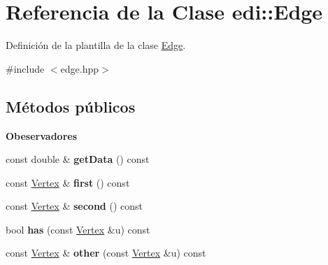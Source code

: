 \hypertarget{classedi_1_1Edge}{}\section{Referencia de la Clase edi\+:\+:Edge}
\label{classedi_1_1Edge}


Definición de la plantilla de la clase \hyperlink{classedi_1_1Edge}{Edge}.  




{\ttfamily \#include $<$edge.\+hpp$>$}

\subsection*{Métodos públicos}
\begin{Indent}{\bf Obeservadores}\par
\begin{DoxyCompactItemize}
\item 
\hypertarget{classedi_1_1Edge_a8eb51032db5e32ea749cb35c200421b3}{}const double \& {\bfseries get\+Data} () const \label{classedi_1_1Edge_a8eb51032db5e32ea749cb35c200421b3}

\item 
\hypertarget{classedi_1_1Edge_aa5397d73c8f574107d0d5f894ea76957}{}const \hyperlink{classedi_1_1Vertex}{Vertex} \& {\bfseries first} () const \label{classedi_1_1Edge_aa5397d73c8f574107d0d5f894ea76957}

\item 
\hypertarget{classedi_1_1Edge_aa545cce56b29c213e3eb4d2021c2c1c2}{}const \hyperlink{classedi_1_1Vertex}{Vertex} \& {\bfseries second} () const \label{classedi_1_1Edge_aa545cce56b29c213e3eb4d2021c2c1c2}

\item 
\hypertarget{classedi_1_1Edge_aa4e3c3020eac39e526e440e515259126}{}bool {\bfseries has} (const \hyperlink{classedi_1_1Vertex}{Vertex} \&u) const \label{classedi_1_1Edge_aa4e3c3020eac39e526e440e515259126}

\item 
\hypertarget{classedi_1_1Edge_a7fd7131daa7fff92342bc4ca8442235e}{}const \hyperlink{classedi_1_1Vertex}{Vertex} \& {\bfseries other} (const \hyperlink{classedi_1_1Vertex}{Vertex} \&u) const \label{classedi_1_1Edge_a7fd7131daa7fff92342bc4ca8442235e}

\end{DoxyCompactItemize}
\end{Indent}
